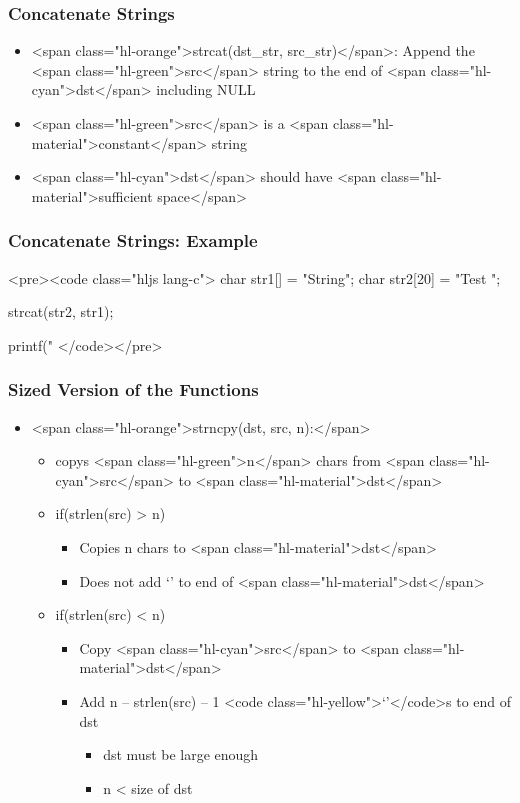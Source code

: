 \documentclass{../c-lecture}
\begin{document}
\begin{frame}
  \frametitle{Concatenate Strings}
  \begin{itemize}
    \item
      <span class="hl-orange">strcat(dst_str, src_str)</span>: Append the
      <span class="hl-green">src</span> string to the end of
      <span class="hl-cyan">dst</span> including NULL

    \item
      <span class="hl-green">src</span> is a
      <span class="hl-material">constant</span> string

    \item
      <span class="hl-cyan">dst</span> should have
      <span class="hl-material">sufficient space</span>

  \end{itemize}
\end{frame}
\begin{frame}
  \frametitle{Concatenate Strings: Example}
  <pre><code class="hljs lang-c">
char str1[] = "String";
char str2[20] = "Test ";

strcat(str2, str1);

printf("%
  </code></pre>
\end{frame}
\begin{frame}
  \frametitle{Sized Version of the Functions}
  \begin{itemize}
    \item <span class="hl-orange">strncpy(dst, src, n):</span>
    \begin{itemize}
      \item
        copys <span class="hl-green">n</span> chars from
        <span class="hl-cyan">src</span> to <span class="hl-material">dst</span>

      \item if(strlen(src) > n)
      \begin{itemize}
        \item Copies n chars to <span class="hl-material">dst</span>
        \item
          Does not add ‘\0’ to end of <span class="hl-material">dst</span>

      \end{itemize}
      \item if(strlen(src) < n)
      \begin{itemize}
        \item
          Copy <span class="hl-cyan">src</span> to
          <span class="hl-material">dst</span>

        \item
          Add n – strlen(src) – 1 <code class="hl-yellow">‘\0’</code>s to end of
          dst

        \begin{itemize}
          \item dst must be large enough
          \item n < size of dst
        \end{itemize}
      \end{itemize}
    \end{itemize}
  \end{itemize}
\end{frame}
\end{document}
